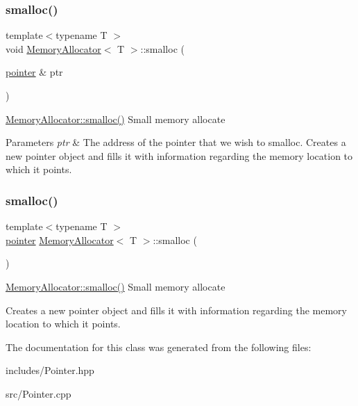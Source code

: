 \subsubsection{\texorpdfstring{smalloc()}{smalloc()}\hspace{0.1cm}{\footnotesize\ttfamily [1/2]}}
{\footnotesize\ttfamily template$<$typename T $>$ \\
void \hyperlink{class_memory_allocator}{Memory\+Allocator}$<$ T $>$\+::smalloc (\begin{DoxyParamCaption}\item[{\hyperlink{structpointer}{pointer} \&}]{ptr }\end{DoxyParamCaption})}

\hyperlink{class_memory_allocator_a8712abdd481153bf70734258bfc3f8b9}{Memory\+Allocator\+::smalloc()} Small memory allocate


\begin{DoxyParams}{Parameters}
{\em ptr} & The address of the pointer that we wish to smalloc. Creates a new pointer object and fills it with information regarding the memory location to which it points. \\
\hline
\end{DoxyParams}
\mbox{\label{class_memory_allocator_a8712abdd481153bf70734258bfc3f8b9}} 
\subsubsection{\texorpdfstring{smalloc()}{smalloc()}\hspace{0.1cm}{\footnotesize\ttfamily [2/2]}}
{\footnotesize\ttfamily template$<$typename T $>$ \\
\hyperlink{structpointer}{pointer} \hyperlink{class_memory_allocator}{Memory\+Allocator}$<$ T $>$\+::smalloc (\begin{DoxyParamCaption}{ }\end{DoxyParamCaption})}

\hyperlink{class_memory_allocator_a8712abdd481153bf70734258bfc3f8b9}{Memory\+Allocator\+::smalloc()} Small memory allocate

Creates a new pointer object and fills it with information regarding the memory location to which it points. 

The documentation for this class was generated from the following files\+:\begin{DoxyCompactItemize}
\item 
includes/Pointer.\+hpp\item 
src/Pointer.\+cpp\end{DoxyCompactItemize}
